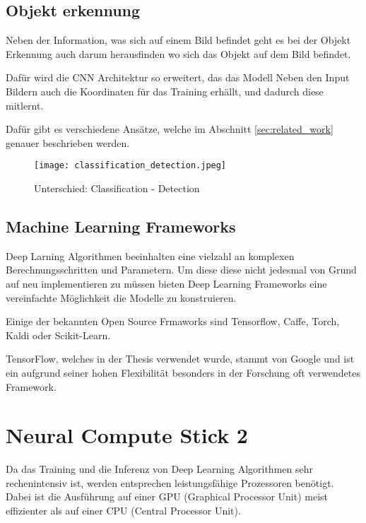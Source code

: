 \subsection{Objekt erkennung}\label{subsec:objdet_det}

Neben der Information, was sich auf einem Bild befindet geht 
es bei der Objekt Erkennung auch darum herausfinden wo sich das 
Objekt auf dem Bild befindet.

Dafür wird die CNN Architektur so erweitert, das das Modell 
Neben den Input Bildern auch die Koordinaten für das 
Training erhällt, und dadurch diese mitlernt.

Dafür gibt es verschiedene Ansätze, welche im Abschnitt \ref{sec:related_work}
genauer beschrieben werden.

\begin{figure}[H]
    \centering
    \label{fig:class_vs_det}
    \texttt{[image: classification\_detection.jpeg]}
    \caption{Unterschied: Classification - Detection}
\end{figure}


\subsection{Machine Learning Frameworks}

Deep Larning Algorithmen beeinhalten eine vielzahl an komplexen
Berechnungsschritten und Parametern. Um diese diese nicht jedesmal 
von Grund auf neu implementieren zu müssen bieten Deep Learning 
Frameworks eine vereinfachte Möglichkeit die Modelle zu konstruieren.

Einige der bekannten Open Source Frmaworks sind Tensorflow,
Caffe, Torch, Kaldi oder Scikit-Learn.


TensorFlow, welches in der Thesis verwendet wurde, stammt von 
Google und ist ein aufgrund seiner hohen Flexibilität besonders 
in der Forschung oft verwendetes Framework.



\section{Neural Compute Stick 2}\label{ncs2}

Da das Training und die Inferenz von Deep Learning Algorithmen
 sehr rechenintensiv ist, werden entsprechen leistungsfähige 
Prozessoren benötigt. Dabei ist die Ausführung auf einer GPU 
(Graphical Processor Unit) meist effizienter als auf einer 
CPU (Central Processor Unit).

